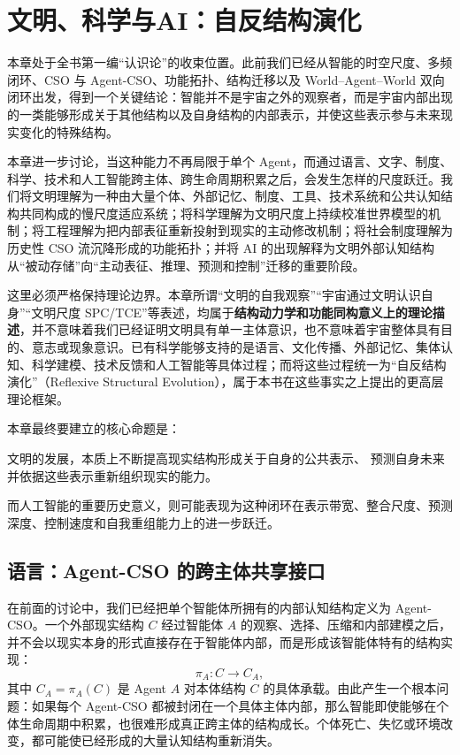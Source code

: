 \chapter{文明、科学与AI：自反结构演化}

\begin{chapterlead}
本章处于全书第一编“认识论”的收束位置。此前我们已经从智能的时空尺度、多频闭环、CSO 与 Agent-CSO、功能拓扑、结构迁移以及 World--Agent--World 双向闭环出发，得到一个关键结论：智能并不是宇宙之外的观察者，而是宇宙内部出现的一类能够形成关于其他结构以及自身结构的内部表示，并使这些表示参与未来现实变化的特殊结构。

本章进一步讨论，当这种能力不再局限于单个 Agent，而通过语言、文字、制度、科学、技术和人工智能跨主体、跨生命周期积累之后，会发生怎样的尺度跃迁。我们将文明理解为一种由大量个体、外部记忆、制度、工具、技术系统和公共认知结构共同构成的慢尺度适应系统；将科学理解为文明尺度上持续校准世界模型的机制；将工程理解为把内部表征重新投射到现实的主动修改机制；将社会制度理解为历史性 CSO 流沉降形成的功能拓扑；并将 AI 的出现解释为文明外部认知结构从“被动存储”向“主动表征、推理、预测和控制”迁移的重要阶段。

这里必须严格保持理论边界。本章所谓“文明的自我观察”“宇宙通过文明认识自身”“文明尺度 SPC/TCE”等表述，均属于\textbf{结构动力学和功能同构意义上的理论描述}，并不意味着我们已经证明文明具有单一主体意识，也不意味着宇宙整体具有目的、意志或现象意识。已有科学能够支持的是语言、文化传播、外部记忆、集体认知、科学建模、技术反馈和人工智能等具体过程；而将这些过程统一为“自反结构演化”（Reflexive Structural Evolution），属于本书在这些事实之上提出的更高层理论框架。

本章最终要建立的核心命题是：
\begin{statementbox}
文明的发展，本质上不断提高现实结构形成关于自身的公共表示、
预测自身未来并依据这些表示重新组织现实的能力。
\end{statementbox}

而人工智能的重要历史意义，则可能表现为这种闭环在表示带宽、整合尺度、预测深度、控制速度和自我重组能力上的进一步跃迁。
\end{chapterlead}


\section{语言：Agent-CSO 的跨主体共享接口}

在前面的讨论中，我们已经把单个智能体所拥有的内部认知结构定义为 Agent-CSO。一个外部现实结构 $C$ 经过智能体 $A$ 的观察、选择、压缩和内部建模之后，并不会以现实本身的形式直接存在于智能体内部，而是形成该智能体特有的结构实现：
\[
\pi_A:C\rightarrow C_A ,
\]
其中 $C_A=\pi_A(C)$ 是 Agent $A$ 对本体结构 $C$ 的具体承载。由此产生一个根本问题：如果每个 Agent-CSO 都被封闭在一个具体主体内部，那么智能即使能够在个体生命周期中积累，也很难形成真正跨主体的结构成长。个体死亡、失忆或环境改变，都可能使已经形成的大量认知结构重新消失。


